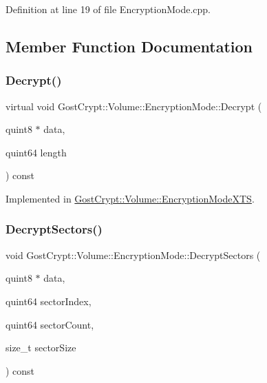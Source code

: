 Definition at line 19 of file Encryption\+Mode.\+cpp.



\subsection{Member Function Documentation}
\mbox{\label{class_gost_crypt_1_1_volume_1_1_encryption_mode_a78203c16b84218aa0e43f7512650cc71}} 
\subsubsection{\texorpdfstring{Decrypt()}{Decrypt()}}
{\footnotesize\ttfamily virtual void Gost\+Crypt\+::\+Volume\+::\+Encryption\+Mode\+::\+Decrypt (\begin{DoxyParamCaption}\item[{quint8 $\ast$}]{data,  }\item[{quint64}]{length }\end{DoxyParamCaption}) const\hspace{0.3cm}{\ttfamily [pure virtual]}}



Implemented in \hyperlink{class_gost_crypt_1_1_volume_1_1_encryption_mode_x_t_s_ae4557cb0886484ee37783f56561e7edd}{Gost\+Crypt\+::\+Volume\+::\+Encryption\+Mode\+X\+TS}.

\mbox{\label{class_gost_crypt_1_1_volume_1_1_encryption_mode_ad25173c1eb3d2bf644cb98ff037f1e23}} 
\subsubsection{\texorpdfstring{Decrypt\+Sectors()}{DecryptSectors()}}
{\footnotesize\ttfamily void Gost\+Crypt\+::\+Volume\+::\+Encryption\+Mode\+::\+Decrypt\+Sectors (\begin{DoxyParamCaption}\item[{quint8 $\ast$}]{data,  }\item[{quint64}]{sector\+Index,  }\item[{quint64}]{sector\+Count,  }\item[{size\+\_\+t}]{sector\+Size }\end{DoxyParamCaption}) const\hspace{0.3cm}{\ttfamily [virtual]}}



